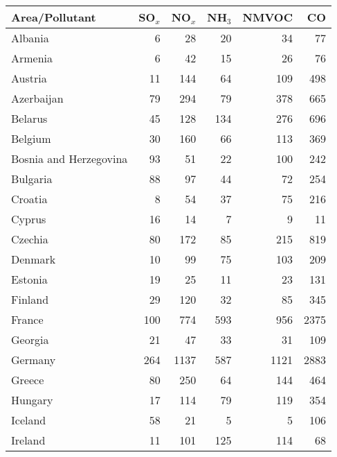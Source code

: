 \begin{table}
\begin{center}
\scriptsize
\begin{tabular}{|l|r|r|r|r|r|}
\hline
 Area/Pollutant&SO$_x$&NO$_x$&NH$_3$&NMVOC&CO\\\hline\hline
                       Albania&     6&    28&    20&    34&    77 \\\hline
                       Armenia&     6&    42&    15&    26&    76 \\\hline
                       Austria&    11&   144&    64&   109&   498 \\\hline
                    Azerbaijan&    79&   294&    79&   378&   665 \\\hline
                       Belarus&    45&   128&   134&   276&   696 \\\hline
                       Belgium&    30&   160&    66&   113&   369 \\\hline
        Bosnia and Herzegovina&    93&    51&    22&   100&   242 \\\hline
                      Bulgaria&    88&    97&    44&    72&   254 \\\hline
                       Croatia&     8&    54&    37&    75&   216 \\\hline
                        Cyprus&    16&    14&     7&     9&    11 \\\hline
                       Czechia&    80&   172&    85&   215&   819 \\\hline
                       Denmark&    10&    99&    75&   103&   209 \\\hline
                       Estonia&    19&    25&    11&    23&   131 \\\hline
                       Finland&    29&   120&    32&    85&   345 \\\hline
                        France&   100&   774&   593&   956&  2375 \\\hline
                       Georgia&    21&    47&    33&    31&   109 \\\hline
                       Germany&   264&  1137&   587&  1121&  2883 \\\hline
                        Greece&    80&   250&    64&   144&   464 \\\hline
                       Hungary&    17&   114&    79&   119&   354 \\\hline
                       Iceland&    58&    21&     5&     5&   106 \\\hline
                       Ireland&    11&   101&   125&   114&    68 \\\hline

\end{tabular}
\end{center}
\end{table}
